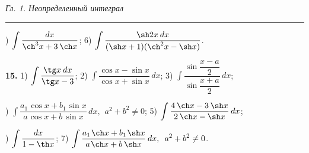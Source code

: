 \documentclass{article}
\begin{document}
\begin{center}
    {\it Гл. 1. Неопределенный интеграл} 
    \smallskip\hrule width 350 pt\smallskip
\end{center}

\par{}) $ \displaystyle \int \dfrac{dx}{{\ch^3 x} + 3\hspace{2pt}{\ch x}} $; \hspace{10pt}
6) $ \displaystyle \int \dfrac{{\sh 2x} \hspace{2pt}dx}{({\sh x}+1)({\ch^2 x}-{\sh x})} $.

{\bf 15.} 1) $ \displaystyle \int \dfrac{{\tg x}\hspace{2pt}dx}{{\tg x}-3} $; \hspace{10pt}
2) $ \displaystyle \int \dfrac{{\cos x} - {\sin x}}{{\cos x}+{\sin x}} \hspace{2pt}dx $; \hspace{10pt}
3) $ \displaystyle \int \dfrac{{\sin \dfrac{x-a}{2}}}{{\sin \dfrac{x+a}{2}}} \hspace{2pt}dx $;

\par{}) $ \displaystyle \int \dfrac{a_1\hspace{1pt}{\cos x}+b_1\hspace{1pt}{\sin x}}{a\hspace{1pt}{\cos x}+b\hspace{2pt}{\sin x}} \hspace{2pt}dx, \hspace{5pt} a^2+b^2 \ne 0 $;
\hspace{10pt} 5) $ \displaystyle \int \dfrac{4\hspace{2pt}{\ch x}-3\hspace{2pt}{\sh x}}{2\hspace{2pt}{\ch x}-{\sh x}} \hspace{2pt}dx $;

\par{}) $ \displaystyle \int \dfrac{dx}{1-{\th x}} $; \hspace{10pt}
7) $ \displaystyle \int \dfrac{a_1\hspace{1pt}{\ch x}+b_1\hspace{1pt}{\sh x}}{a\hspace{1pt}{\ch x}+b\hspace{2pt}{\sh x}} \hspace{2pt}dx, \hspace{5pt} a^2+b^2 \ne 0 $.
\end{document}
